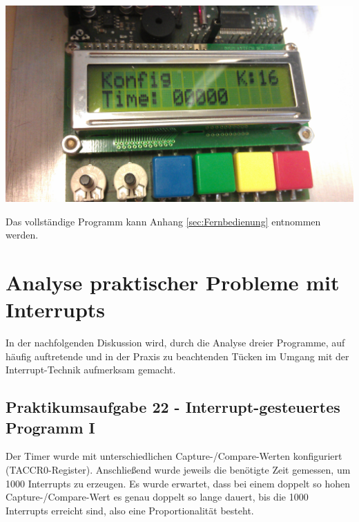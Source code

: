 \documentclass[12pt,a4paper,bibliography=totocnumbered,listof=totocnumbered]{scrartcl}
\begin{document}
\vspace{1em}
\begin{minipage}{\linewidth}
	\centering
	\includegraphics[width=0.7\linewidth]{img/Fernbedienung.jpg}
	\label{fig:FernbedienungKonfig}
\end{minipage}

\vspace{1em}
Das vollständige Programm kann Anhang \ref{sec:Fernbedienung} entnommen werden.
 
\pagebreak



\section{Analyse praktischer Probleme mit Interrupts}
In der nachfolgenden Diskussion wird, durch die Analyse dreier Programme, auf häufig auftretende und in der Praxis zu beachtenden Tücken im Umgang mit der Interrupt-Technik aufmerksam gemacht.

\subsection{Praktikumsaufgabe 22 - Interrupt-gesteuertes Programm I}
Der Timer wurde mit unterschiedlichen Capture-/Compare-Werten konfiguriert (TACCR0-Register). Anschließend wurde jeweils die benötigte Zeit gemessen, um 1000 Interrupts zu erzeugen. Es wurde erwartet, dass bei einem doppelt so hohen Capture-/Compare-Wert es genau doppelt so lange dauert, bis die 1000 Interrupts erreicht sind, also eine Proportionalität besteht.
\end{document}
